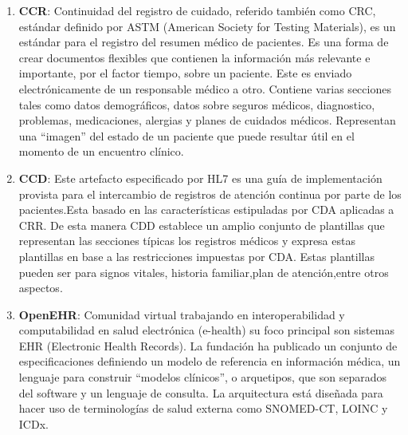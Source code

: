 \begin{enumerate}
    \item\textbf{CCR}: Continuidad del registro de cuidado, referido también como CRC, estándar definido por ASTM (American Society for Testing Materials), es un estándar para el registro del resumen médico de pacientes. Es una forma de crear documentos flexibles que contienen la información más relevante e importante, por el factor tiempo, sobre un paciente. Este es enviado electrónicamente de un responsable médico a otro. Contiene varias secciones tales como datos demográficos, datos sobre seguros médicos, diagnostico, problemas, medicaciones, alergias y planes de cuidados médicos. Representan una ``imagen'' del estado de un paciente que puede resultar útil en el momento de un encuentro clínico.
    
    
    \item\textbf{CCD}:
	Este artefacto especificado por HL7 es una guía de implementación provista para el intercambio de registros de atención continua por parte de los pacientes.Esta basado en las características estipuladas por CDA aplicadas a CRR. De esta manera CDD establece un amplio conjunto de plantillas que representan las secciones típicas los registros médicos y expresa estas plantillas en base a las restricciones impuestas por CDA. Estas plantillas pueden ser para signos vitales, historia familiar,plan de atención,entre otros aspectos. 
    
    \item\textbf{OpenEHR}: Comunidad virtual trabajando en interoperabilidad y computabilidad en salud electrónica (e-health) su foco principal son sistemas EHR (Electronic Health Records). La fundación ha publicado un conjunto de especificaciones definiendo un modelo de referencia en información médica, un lenguaje para construir ``modelos clínicos'', o arquetipos, que son separados del software y un lenguaje de consulta. La arquitectura está diseñada para hacer uso de terminologías de salud externa como SNOMED-CT, LOINC y ICDx. 
    
\end{enumerate}

